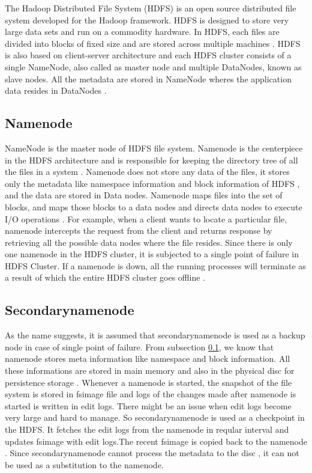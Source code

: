 \documentclass[11pt,a4paper,bibtotoc,idxtotoc,headsepline,footsepline,footexclude,BCOR12mm,DIV13]{scrbook}
\begin{document}
The Hadoop Distributed File System (HDFS) is an open source distributed file system developed for the Hadoop framework. HDFS is designed to store very large data sets and run on a commodity hardware. In HDFS, each files are divided into blocks of fixed size and are stored across multiple machines \cite{HDFS:architecture}. HDFS is also based on client-server architecture and each HDFS cluster consists of a single NameNode, also called as master node and multiple DataNodes, known as slave nodes. All the metadata are stored in NameNode wheres the application data resides in DataNodes \cite{hadoop:architecture}.

\subsection{Namenode}
\label{NameNode}
NameNode is the master node of HDFS file system. Namenode is the centerpiece in the HDFS architecture and is responsible for keeping the directory tree of all the files in a system \cite{HDFS:namenodeanddatanode}. Namenode does not store any data of the files, it stores 
only the metadata like namespace information and block information of HDFS \cite{HDFS:namenodeanddatanode}, and the data are stored in Data nodes. Namenode maps files into the set of blocks, and maps those blocks to a data nodes and directs data nodes to execute I/O operations \cite{HDFS:namenodeanddatanode}. For example, when a client wants to locate a particular file, namenode intercepts the request from the client and returns response by retrieving all the possible data nodes where the file resides. Since there is only one namenode in the HDFS cluster, it is subjected to a single point of failure in HDFS Cluster. If a namenode is down, all the running processes will terminate as a result of which the entire HDFS cluster goes offline \cite{HDFS:namenodeanddatanode}.  

\subsection{Secondarynamenode}
\label{SecondaryNameNode}
As the name suggests, it is assumed that secondarynamenode is used as a backup node in case of single point of failure. From subsection \ref{NameNode}, we know that namenode stores meta information like namespace and block information. All these informations are stored in main memory and also in the physical disc for persistence storage \cite{HDFS:secondarynamenode}. Whenever a namenode is started, the snapshot of the file system is stored in fsimage file and logs of the changes made after namenode is started is written in edit logs. There might be an issue when edit logs become very large and hard to manage. So secondarynamenode is used as a checkpoint in the HDFS. It fetches the edit logs from the namenode in reqular interval and updates fsimage with edit logs.The recent fsimage is copied back to the namenode \cite{HDFS:secondarynamenode}. Since secondarynamenode cannot process the metadata to the disc \cite{HDFS:architecture}, it can not be used as a substitution to the namenode.
\end{document}
